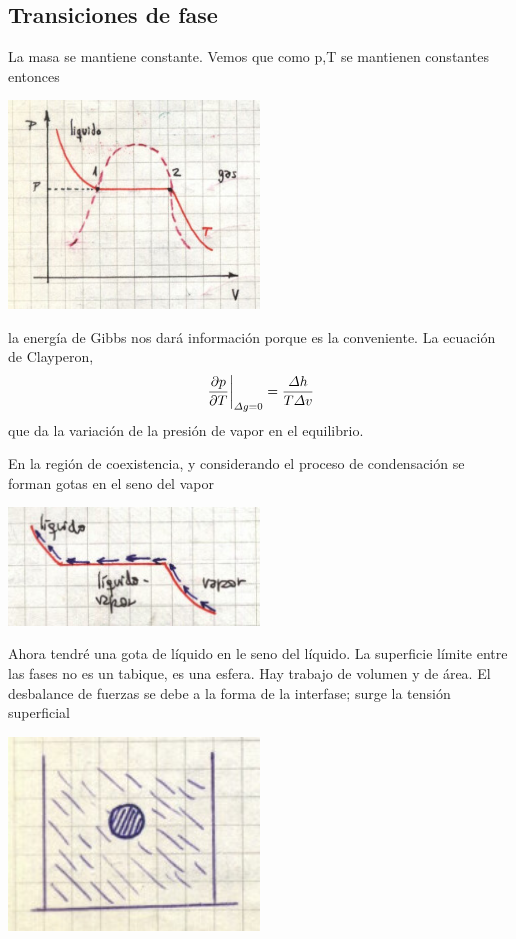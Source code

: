 \documentclass[10pt,oneside]{CBFT_book}
\begin{document}
\subsection{Transiciones de fase}

La masa se mantiene constante. Vemos que como p,T se mantienen constantes entonces

\includegraphics[width=0.50\textwidth]{images/1606329049.jpg}

la energía de Gibbs nos dará información porque es la conveniente.
La ecuación de Clayperon,
\[
	\left.\frac{\partial^{\hspace{-0.05em}} {p}}{\partial {T}^{\hspace{-0.05em}}}\right|_{\Delta g=0} = \frac{\Delta h}{T \Delta v}
\]
que da la variación de la presión de vapor en el equilibrio.

En la región de coexistencia, y considerando el proceso de condensación se forman
gotas en el seno del vapor

\includegraphics[width=0.50\textwidth]{images/1606329052.jpg}

Ahora tendré una gota de líquido en le seno del líquido. La superficie límite entre las fases
no es un tabique, es una esfera.
Hay trabajo de volumen y de área. El desbalance de fuerzas se debe a la forma de la interfase;
surge la tensión superficial

\includegraphics[width=0.50\textwidth]{images/1606329057.jpg}
\end{document}
